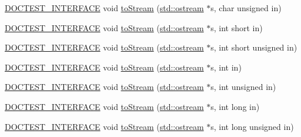 \begin{DoxyCompactItemize}
\item 
\mbox{\hyperlink{doctest_8h_a9c16ffc635ec47f07797d21ede26b1a5}{D\+O\+C\+T\+E\+S\+T\+\_\+\+I\+N\+T\+E\+R\+F\+A\+CE}} void \mbox{\hyperlink{namespacedoctest_1_1detail_a23f8f4324507a40de4fb636f20f36fb7}{to\+Stream}} (\mbox{\hyperlink{doctest_8h_a116af65cb5e924b33ad9d9ecd7a783f3}{std\+::ostream}} $\ast$s, char unsigned in)
\item 
\mbox{\hyperlink{doctest_8h_a9c16ffc635ec47f07797d21ede26b1a5}{D\+O\+C\+T\+E\+S\+T\+\_\+\+I\+N\+T\+E\+R\+F\+A\+CE}} void \mbox{\hyperlink{namespacedoctest_1_1detail_aaa111edaaf87cd57961d2c1923d762cb}{to\+Stream}} (\mbox{\hyperlink{doctest_8h_a116af65cb5e924b33ad9d9ecd7a783f3}{std\+::ostream}} $\ast$s, int short in)
\item 
\mbox{\hyperlink{doctest_8h_a9c16ffc635ec47f07797d21ede26b1a5}{D\+O\+C\+T\+E\+S\+T\+\_\+\+I\+N\+T\+E\+R\+F\+A\+CE}} void \mbox{\hyperlink{namespacedoctest_1_1detail_a72d0259a5b3c0f0f3a88ea8d732223f8}{to\+Stream}} (\mbox{\hyperlink{doctest_8h_a116af65cb5e924b33ad9d9ecd7a783f3}{std\+::ostream}} $\ast$s, int short unsigned in)
\item 
\mbox{\hyperlink{doctest_8h_a9c16ffc635ec47f07797d21ede26b1a5}{D\+O\+C\+T\+E\+S\+T\+\_\+\+I\+N\+T\+E\+R\+F\+A\+CE}} void \mbox{\hyperlink{namespacedoctest_1_1detail_af6f60470d3f0f2b858a03dad822ca9c6}{to\+Stream}} (\mbox{\hyperlink{doctest_8h_a116af65cb5e924b33ad9d9ecd7a783f3}{std\+::ostream}} $\ast$s, int in)
\item 
\mbox{\hyperlink{doctest_8h_a9c16ffc635ec47f07797d21ede26b1a5}{D\+O\+C\+T\+E\+S\+T\+\_\+\+I\+N\+T\+E\+R\+F\+A\+CE}} void \mbox{\hyperlink{namespacedoctest_1_1detail_a7001b8028c2c21968f2a0deb3417e9a4}{to\+Stream}} (\mbox{\hyperlink{doctest_8h_a116af65cb5e924b33ad9d9ecd7a783f3}{std\+::ostream}} $\ast$s, int unsigned in)
\item 
\mbox{\hyperlink{doctest_8h_a9c16ffc635ec47f07797d21ede26b1a5}{D\+O\+C\+T\+E\+S\+T\+\_\+\+I\+N\+T\+E\+R\+F\+A\+CE}} void \mbox{\hyperlink{namespacedoctest_1_1detail_a830b2dd9dae3bc74ae0c9002b7a2dbed}{to\+Stream}} (\mbox{\hyperlink{doctest_8h_a116af65cb5e924b33ad9d9ecd7a783f3}{std\+::ostream}} $\ast$s, int long in)
\item 
\mbox{\hyperlink{doctest_8h_a9c16ffc635ec47f07797d21ede26b1a5}{D\+O\+C\+T\+E\+S\+T\+\_\+\+I\+N\+T\+E\+R\+F\+A\+CE}} void \mbox{\hyperlink{namespacedoctest_1_1detail_a82d6e6a85cac7cfb399d8215308369fc}{to\+Stream}} (\mbox{\hyperlink{doctest_8h_a116af65cb5e924b33ad9d9ecd7a783f3}{std\+::ostream}} $\ast$s, int long unsigned in)
\item 

\end{DoxyCompactItemize}
